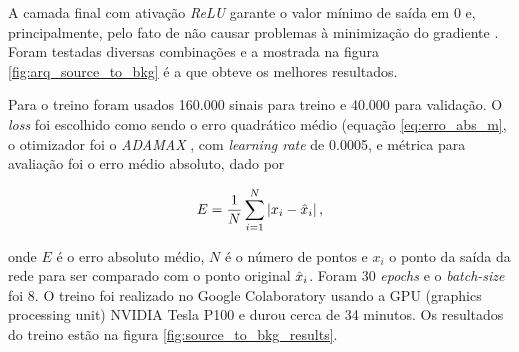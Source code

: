 \documentclass[a4paper,12pt,oneside]{book}
\begin{document}
\par A camada final com ativação \textit{ReLU} garante o valor mínimo de saída em 0 e, principalmente, pelo fato de não causar problemas à minimização do gradiente \cite{VGP}. Foram testadas diversas combinações e a mostrada na figura \ref{fig:arq_source_to_bkg} é a que obteve os melhores resultados. 

\par Para o treino foram usados 160.000 sinais para treino e 40.000 para validação. O \textit{loss} foi escolhido como sendo o erro quadrático médio (equação \ref{eq:erro_abs_m}, o otimizador foi o \textit{ADAMAX} \cite{ADAMAX}, com \textit{learning rate} de 0.0005, e métrica para avaliação foi o erro médio absoluto, dado por

\begin{equation}\label{eq:erro_abs_m}
    E = \frac{1}{N}\sum_{i = 1}^{N} \left | x_i - \Hat{x}_i\right |,
\end{equation}

onde $E$ é o erro absoluto médio, $N$ é o número de pontos e $x_i$ o ponto da saída da rede para ser comparado com o ponto original $\Hat{x}_i$. Foram 30 \textit{epochs} e o \textit{batch-size} foi 8. O treino foi realizado no Google Colaboratory \cite{google_colab} usando a GPU (graphics processing unit) NVIDIA Tesla P100 e durou cerca de 34 minutos. Os resultados do treino estão na figura \ref{fig:source_to_bkg_results}.

\end{document}
